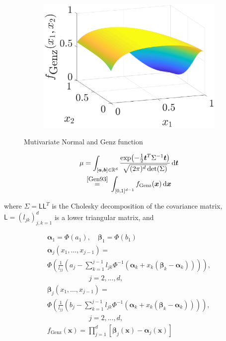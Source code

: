 \documentclass[twocolumn]{svjour3}          %
\newcommand{\bm}[1]{\boldsymbol{#1}}
\newcommand{\mSigma}{\Sigma}
\newcommand{\dif}[1]{\text{d}{#1}}
\newcommand{\reals}{\mathbb{R}}
\newcommand{\valpha}{{\bm{\alpha}}}
\newcommand{\vbeta}{{\bm{\beta}}}
\newcommand{\va}{\bm{a}}
\newcommand{\vb}{\bm{b}}
\newcommand{\vt}{\bm{t}}
\newcommand{\vx}{\bm{x}}
\newcommand{\dvx}{\dif{\bm{x}}}
\newcommand{\dvt}{\dif{\bm{t}}}
\newcommand{\mL}{\mathsf{L}}
\begin{document}
\begin{enumerate}
\begin{figure}
\begin{subfigure}{0.48\textwidth}
\includegraphics[width=\textwidth]{GenzFun}
\end{subfigure}
\caption{Mutivariate Normal and Genz function }
\label{fig:MVN and Genz}
\end{figure}

\begin{multline*}
\mu = \int_{[\va,\vb] \in \reals^d} \frac{\exp\bigl(- \frac 12 \vt^T \mSigma^{-1} \vt \bigr)}{\sqrt{(2 \pi)^d \det(\mSigma)}} \, \dvt 
\\
\overset{\text{\small\cite{Gen93}}}{=} \,
\int_{[0,1]^{d-1}} f_{\text{Genz}}(\vx) \, \dvx 
\end{multline*} 

where $\mSigma= \mL \mL^T$ is the Cholesky decomposition of the covariance matrix, $\mL = (l_{jk})_{j,k=1}^d$ is a lower triangular matrix, and

\begin{multline*}
\valpha_1 = \Phi(a_1), \quad \vbeta_1 = \Phi(b_1)
\\
\valpha_j(x_1,...,x_{j-1}) = 
\\
\Phi
\left(
\frac{1}{l_{jj}} 
\left(
a_j - \sum_{k=1}^{j-1} l_{jk} \Phi^{-1}(\valpha_k + x_k(\vbeta_k-\valpha_k))
\right)
\right), 
\\
\qquad \qquad \qquad j=2,...,d,
\\
\vbeta_j(x_1,...,x_{j-1}) = 
\\
\Phi
\left(
\frac{1}{l_{jj}} 
\left(
b_j - \sum_{k=1}^{j-1} l_{jk} \Phi^{-1}(\valpha_k + x_k(\vbeta_k-\valpha_k))
\right)
\right), 
\\
\qquad \qquad \qquad j=2,...,d,
\\
f_{\text{Genz}}(\vx) = \prod_{j=1}^d [\vbeta_j(\vx) - \valpha_j(\vx)]
\end{multline*}


\end{enumerate}
\end{document}
